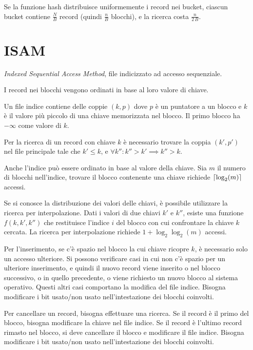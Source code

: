 Se la funzione hash distribuisce uniformemente i record nei bucket, ciascun bucket contiene $\frac{N}{B}$ record (quindi $\frac{n}{B}$ blocchi), e la ricerca costa $\frac{n}{2 \, B}$.

\section{ISAM}

\emph{Indexed Sequential Access Method}, file indicizzato ad accesso sequenziale.

I record nei blocchi vengono ordinati in base al loro valore di chiave.

Un file indice contiene delle coppie $(k,p)$ dove $p$ \`e un puntatore a un blocco e $k$ \`e il valore pi\`u piccolo di una chiave memorizzata nel blocco. Il primo blocco ha $- \infty$ come valore di $k$.

Per la ricerca di un record con chiave $k$ \`e necessario trovare la coppia $(k',p')$ nel file principale tale che $k' \le k$, e $\forall k'' : k'' > k' \implies k'' > k$.

Anche l'indice pu\`o essere ordinato in base al valore della chiave. Sia $m$ il numero di blocchi nell'indice, trovare il blocco contenente una chiave richiede $\left\lceil{\log_2 (m)}\right\rceil$ accessi.

Se si conosce la distribuzione dei valori delle chiavi, \`e possibile utilizzare la ricerca per interpolazione. Dati i valori di due chiavi $k'$ e $k''$, esiste una funzione $f(k,k',k'')$ che restituisce l'indice $i$ del blocco con cui confrontare la chiave $k$ cercata. La ricerca per interpolazione richiede $1 + \log_2 \log_2 (m)$ accessi.

Per l'inserimento, se c'\`e spazio nel blocco la cui chiave ricopre $k$, \`e necessario solo un accesso ulteriore. Si possono verificare casi in cui non c'\`e spazio per un ulteriore inserimento, e quindi il nuovo record viene inserito o nel blocco successivo, o in quello precedente, o viene richiesto un nuovo blocco al sistema operativo. Questi altri casi comportano la modifica del file indice. Bisogna modificare i bit usato/non usato nell'intestazione dei blocchi coinvolti.

Per cancellare un record, bisogna effettuare una ricerca. Se il record \`e il primo del blocco, bisogna modificare la chiave nel file indice. Se il record \`e l'ultimo record rimasto nel blocco, si deve cancellare il blocco e modificare il file indice. Bisogna modificare i bit usato/non usato nell'intestazione dei blocchi coinvolti.

